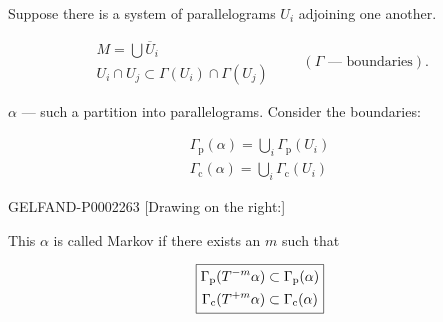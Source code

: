 Suppose there is a system of parallelograms $U_i$ adjoining one another.



\begin{equation*}
 \begin{gathered}
 M=\bigcup\overline{U}_i\\
 U_i\cap U_j\subset\Gamma (U_i)\cap\Gamma (U_j)
 \end{gathered}
 \qquad (\Gamma\text{ — boundaries}).
\end{equation*}



$\alpha$ — such a partition into parallelograms. Consider the boundaries:



\begin{equation*}
 \begin{gathered}
 \Gamma_{\mathrm{p}}(\alpha)=\bigcup_i\Gamma_{\mathrm{p}}(U_i)\\
 \Gamma_{\mathrm{c}}(\alpha)=\bigcup_i\Gamma_{\mathrm{c}}(U_i)
 \end{gathered}
\end{equation*}



\begin{GelfandAdjacentEvidence}{GELFAND-P000226}{3}
[Drawing on the right:]




\end{GelfandAdjacentEvidence}

This $\alpha$ is called Markov if there exists an $m$ such that



\begin{equation*}
 \fbox{$\begin{gathered}
 \Gamma_{\mathrm{p}}(T^{-m}\alpha)\subset\Gamma_{\mathrm{p}}(\alpha)\\
 \Gamma_{\mathrm{c}}(T^{+m}\alpha)\subset\Gamma_{\mathrm{c}}(\alpha)
 \end{gathered}$}
\end{equation*}




